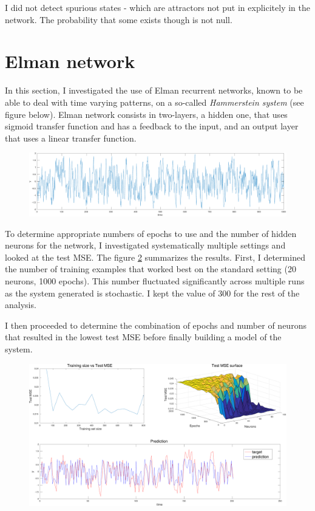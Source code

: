 \documentclass[11pt, a4paper]{article}
\begin{document}
I did not detect spurious states - which are attractors not put in
explicitely in the network. The probability that some exists though is
not null.

\section{Elman network}

In this section, I investigated the use of Elman recurrent networks,
known to be able to deal with time varying patterns, on a so-called
\emph{Hammerstein system} (see figure below). Elman network consists
in two-layers, a hidden one, that uses sigmoid transfer function and
has a feedback to the input, and an output layer that uses a linear
transfer function.

\begin{figure}[H]
  \centering
  \includegraphics[scale=0.4]{hammerstein_system.pdf}
  \label{fig:hammerstein_system}
\end{figure}

To determine appropriate numbers of epochs to use and the number of
hidden neurons for the network, I investigated systematically multiple
settings and looked at the test MSE. The figure
\ref{fig:elman_prediction} summarizes the results. First, I determined
the number of training examples that worked best on the standard
setting (20 neurons, 1000 epochs). This number fluctuated
significantly across multiple runs as the system generated is
stochastic. I kept the value of 300 for the rest of the analysis.

I then proceeded to determine the combination of epochs and number of
neurons that resulted in the lowest test MSE before finally building a
model of the system.

\begin{figure}[H]
  \centering
  \includegraphics[scale=0.4]{elman_prediction.pdf}
  \label{fig:elman_prediction}
\end{figure}
\end{document}
